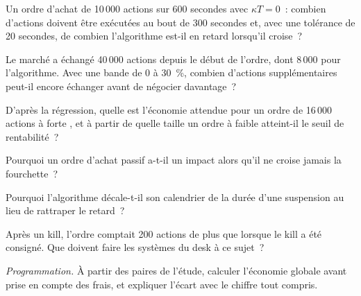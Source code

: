 \begin{exercise}[$\star$]\label{exo:mx:build-an-execution-algorithm:1}
Un ordre d'achat de 10\,000 actions sur 600 secondes avec $\kappa T = 0$~: combien d'actions doivent être exécutées au bout de 300 secondes
et, avec une tolérance de 20 secondes, de combien l'algorithme est-il en retard lorsqu'il croise~?
\end{exercise}

\begin{exercise}[$\star$]\label{exo:mx:build-an-execution-algorithm:2}
Le marché a échangé 40\,000 actions depuis le début de l'ordre, dont 8\,000 pour l'algorithme. Avec une bande de 0 à 30~\%, combien d'actions supplémentaires peut-il encore échanger
avant de négocier davantage~?
\end{exercise}

\begin{exercise}[$\star$]\label{exo:mx:build-an-execution-algorithm:3}
D'après la régression, quelle est l'économie attendue pour un ordre de 16\,000 actions à forte , et à partir de quelle taille un ordre à faible  atteint-il le seuil de rentabilité~?
\end{exercise}

\begin{exercise}[$\star\star$]\label{exo:mx:build-an-execution-algorithm:4}
Pourquoi un ordre d'achat passif a-t-il un impact alors qu'il ne croise jamais la fourchette~?
\end{exercise}

\begin{exercise}[$\star\star$]\label{exo:mx:build-an-execution-algorithm:5}
Pourquoi l'algorithme décale-t-il son calendrier de la durée d'une suspension au lieu de rattraper le retard~?
\end{exercise}

\begin{exercise}[$\star\star$]\label{exo:mx:build-an-execution-algorithm:6}
Après un kill, l'ordre comptait 200 actions de plus que lorsque le kill a été consigné. Que doivent faire les systèmes du desk à ce sujet~?
\end{exercise}

\begin{exercise}[$\star\star\star$]\label{exo:mx:build-an-execution-algorithm:7}
\emph{Programmation.} À partir des paires de l'étude, calculer l'économie globale avant prise en compte des frais, et expliquer l'écart avec le chiffre tout compris.
\end{exercise}

